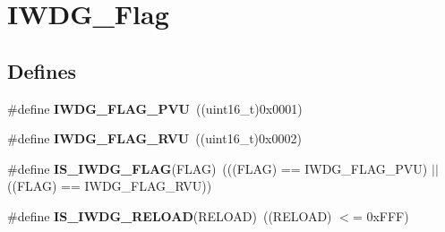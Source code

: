 \hypertarget{group__IWDG__Flag}{
\section{IWDG\_\-Flag}
\label{group__IWDG__Flag}
}
\subsection*{Defines}
\begin{DoxyCompactItemize}
\item 
\hypertarget{group__IWDG__Flag_gae20afcf399fad1534e79a8d30ea86c9c}{
\#define {\bfseries IWDG\_\-FLAG\_\-PVU}~((uint16\_\-t)0x0001)}
\label{group__IWDG__Flag_gae20afcf399fad1534e79a8d30ea86c9c}

\item 
\hypertarget{group__IWDG__Flag_ga3731bf2711c234ffe5b405fb6634ebca}{
\#define {\bfseries IWDG\_\-FLAG\_\-RVU}~((uint16\_\-t)0x0002)}
\label{group__IWDG__Flag_ga3731bf2711c234ffe5b405fb6634ebca}

\item 
\hypertarget{group__IWDG__Flag_ga5be9ae9ba267cf09a00523ef3e219293}{
\#define {\bfseries IS\_\-IWDG\_\-FLAG}(FLAG)~(((FLAG) == IWDG\_\-FLAG\_\-PVU) $|$$|$ ((FLAG) == IWDG\_\-FLAG\_\-RVU))}
\label{group__IWDG__Flag_ga5be9ae9ba267cf09a00523ef3e219293}

\item 
\hypertarget{group__IWDG__Flag_ga7c319e96bded8e3c38c6a42a1b335c68}{
\#define {\bfseries IS\_\-IWDG\_\-RELOAD}(RELOAD)~((RELOAD) $<$= 0xFFF)}
\label{group__IWDG__Flag_ga7c319e96bded8e3c38c6a42a1b335c68}

\end{DoxyCompactItemize}
